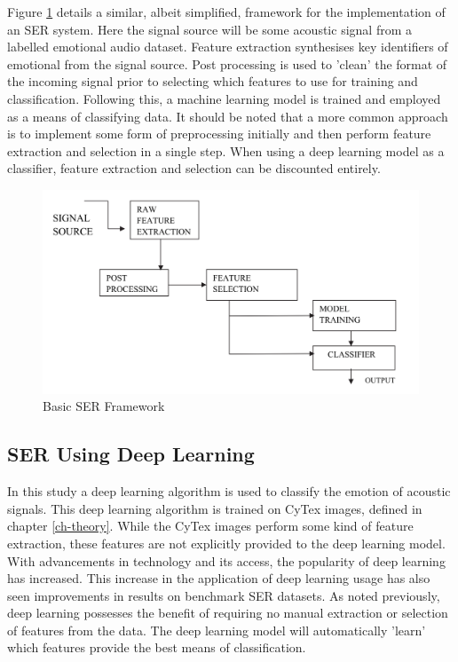  Figure \ref{ser_pipeline_fig} details a similar, albeit simplified, framework for the implementation of an SER system. Here the signal source will be some acoustic signal from a labelled emotional audio dataset. Feature extraction synthesises key identifiers of emotional from the signal source. Post processing is used to 'clean' the format of the incoming signal prior to selecting which features to use for training and classification. Following this, a machine learning model is trained and employed as a means of classifying data. It should be noted that a more common approach is to implement some form of preprocessing initially and then perform feature extraction and selection in a single step. When using a deep learning model as a classifier, feature extraction and selection can be discounted entirely.
\begin{figure}[h]
        \centering
        \includegraphics[scale = 1.0]{images/Basic SER framework.png}
        \caption{Basic SER Framework \cite{Ramakrishnan12}}
        \label{ser_pipeline_fig}
\end{figure}

\subsection{SER Using Deep Learning}
In this study a deep learning algorithm is used to classify the emotion of acoustic signals. This deep learning algorithm is trained on CyTex images, defined in chapter \ref{ch-theory}. While the CyTex images perform some kind of feature extraction, these features are not explicitly provided to the deep learning model. With advancements in technology and its access, the popularity of deep learning has increased. This increase in the application of deep learning usage has also seen improvements in results on benchmark SER datasets. As noted previously, deep learning possesses the benefit of requiring no manual extraction or selection of features from the data. The deep learning model will automatically 'learn' which features provide the best means of classification.


